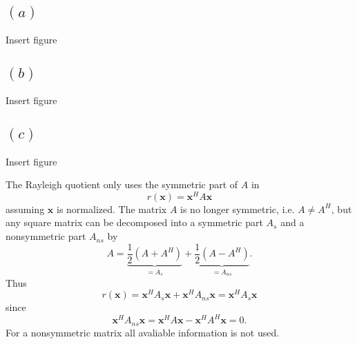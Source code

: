 
\subsection{$(a)$}
Insert figure
\subsection{$(b)$}
Insert figure
\subsection{$(c)$}
Insert figure

The Rayleigh quotient only uses the symmetric part of $A$ in
\begin{equation*}
  r(\mathbf{x}) = \mathbf{x}^{H}A\mathbf{x}
\end{equation*}
assuming $\mathbf{x}$ is normalized.
The matrix $A$ is no longer symmetric, i.e. $A\neq A^{H}$, but any square matrix can be decomposed into a symmetric part $A_{s}$ and a nonsymmetric part $A_{ns}$ by
\begin{equation*}
  A = \underbrace{\frac{1}{2}\left(A + A^{H}\right)}_{= A_{s}} + \underbrace{\frac{1}{2}\left(A - A^{H}\right)}_{=A_{ns}}.
\end{equation*}
Thus
\begin{equation*}
  r(\mathbf{x}) = \mathbf{x}^{H}A_{s}\mathbf{x} + \mathbf{x}^{H}A_{ns}\mathbf{x} = \mathbf{x}^{H}A_{s}\mathbf{x}
\end{equation*}
since
\begin{equation*}
 \mathbf{x}^{H}A_{ns}\mathbf{x}=\mathbf{x}^{H}A\mathbf{x} - \mathbf{x}^{H}A^{H}\mathbf{x} = 0.
\end{equation*}
For a nonsymmetric matrix all avaliable information is not used.
